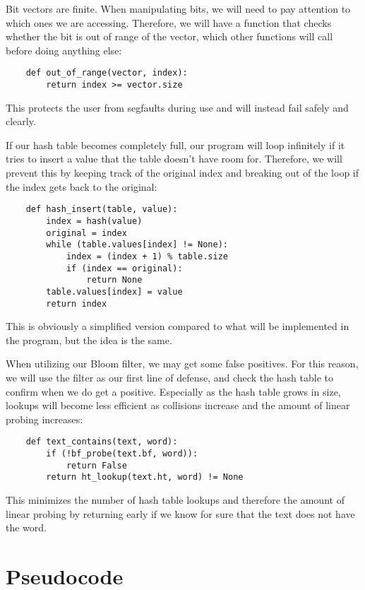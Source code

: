 \documentclass[12pt]{article}
\begin{document}
Bit vectors are finite. When manipulating bits, we will need to pay attention to which ones we are accessing. Therefore, we will have a function that checks whether the bit is out of range of the vector, which other functions will call before doing anything else:
\begin{verbatim}
    def out_of_range(vector, index):
        return index >= vector.size
\end{verbatim}
This protects the user from segfaults during use and will instead fail safely and clearly.

If our hash table becomes completely full, our program will loop infinitely if it tries to insert a value that the table doesn't have room for. Therefore, we will prevent this by keeping track of the original index and breaking out of the loop if the index gets back to the original:
\begin{verbatim}
    def hash_insert(table, value):
        index = hash(value)
        original = index
        while (table.values[index] != None):
            index = (index + 1) % table.size
            if (index == original):
                return None
        table.values[index] = value
        return index
\end{verbatim}
This is obviously a simplified version compared to what will be implemented in the program, but the idea is the same.

When utilizing our Bloom filter, we may get some false positives. For this reason, we will use the filter as our first line of defense, and check the hash table to confirm when we do get a positive. Especially as the hash table grows in size, lookups will become less efficient as collisions increase and the amount of linear probing increases:
\begin{verbatim}
    def text_contains(text, word):
        if (!bf_probe(text.bf, word)):
            return False
        return ht_lookup(text.ht, word) != None
\end{verbatim}
This minimizes the number of hash table lookups and therefore the amount of linear probing by returning early if we know for sure that the text does not have the word.
\section{Pseudocode}
\end{document}
